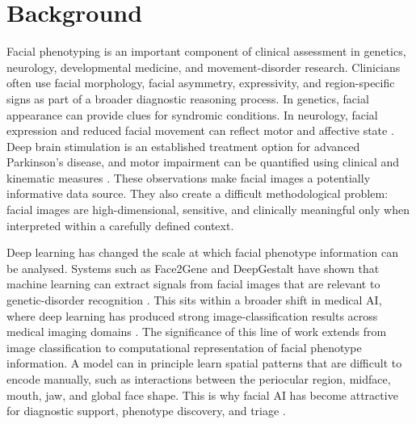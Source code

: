 
\section{Background}

Facial phenotyping is an important component of clinical assessment in genetics, neurology, developmental medicine, and movement-disorder research. Clinicians often use facial morphology, facial asymmetry, expressivity, and region-specific signs as part of a broader diagnostic reasoning process. In genetics, facial appearance can provide clues for syndromic conditions. In neurology, facial expression and reduced facial movement can reflect motor and affective state    . Deep brain stimulation is an established treatment option for advanced Parkinson's disease, and motor impairment can be quantified using clinical and kinematic measures    . These observations make facial images a potentially informative data source. They also create a difficult methodological problem: facial images are high-dimensional, sensitive, and clinically meaningful only when interpreted within a carefully defined context.


Deep learning has changed the scale at which facial phenotype information can be analysed. Systems such as Face2Gene and DeepGestalt have shown that machine learning can extract signals from facial images that are relevant to genetic-disorder recognition . This sits within a broader shift in medical AI, where deep learning has produced strong image-classification results across medical imaging domains    . The significance of this line of work extends from image classification to computational representation of facial phenotype information. A model can in principle learn spatial patterns that are difficult to encode manually, such as interactions between the periocular region, midface, mouth, jaw, and global face shape. This is why facial AI has become attractive for diagnostic support, phenotype discovery, and triage  .


